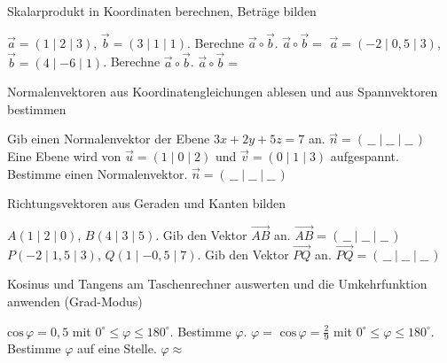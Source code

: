 \setcounter{aufgabe}{0}

\begin{aufgabe}{Skalarprodukt in Koordinaten berechnen, Beträge bilden}
\begin{teile}
\teil $\vec a = (1 \mid 2 \mid 3)$, $\vec b = (3 \mid 1 \mid 1)$. Berechne $\vec a \circ \vec b$. $\vec a \circ \vec b =$ \leerfeld
\teil $\vec a = (-2 \mid 0{,}5 \mid 3)$, $\vec b = (4 \mid -6 \mid 1)$. Berechne $\vec a \circ \vec b$. $\vec a \circ \vec b =$ \leerfeld
\end{teile}
\end{aufgabe}

\begin{aufgabe}{Normalenvektoren aus Koordinatengleichungen ablesen und aus Spannvektoren bestimmen}
\begin{teile}
\teil Gib einen Normalenvektor der Ebene $3x + 2y + 5z = 7$ an. $\vec n = (\,\_\_ \mid \_\_ \mid \_\_\,)$
\teil Eine Ebene wird von $\vec u = (1 \mid 0 \mid 2)$ und $\vec v = (0 \mid 1 \mid 3)$ aufgespannt. Bestimme einen Normalenvektor. $\vec n = (\,\_\_ \mid \_\_ \mid \_\_\,)$
\end{teile}
\end{aufgabe}

\begin{aufgabe}{Richtungsvektoren aus Geraden und Kanten bilden}
\begin{teile}
\teil $A(1 \mid 2 \mid 0)$, $B(4 \mid 3 \mid 5)$. Gib den Vektor $\overrightarrow{AB}$ an. $\overrightarrow{AB} = (\,\_\_ \mid \_\_ \mid \_\_\,)$
\teil $P(-2 \mid 1{,}5 \mid 3)$, $Q(1 \mid -0{,}5 \mid 7)$. Gib den Vektor $\overrightarrow{PQ}$ an. $\overrightarrow{PQ} = (\,\_\_ \mid \_\_ \mid \_\_\,)$
\end{teile}
\end{aufgabe}

\begin{aufgabe}{Kosinus und Tangens am Taschenrechner auswerten und die Umkehrfunktion anwenden (Grad-Modus)}
\begin{teile}
\teil $\mathrm{cos}\,\varphi = 0{,}5$ mit $0^\circ \le \varphi \le 180^\circ$. Bestimme $\varphi$. $\varphi =$ \leerfeld
\teil $\mathrm{cos}\,\varphi = \frac{2}{9}$ mit $0^\circ \le \varphi \le 180^\circ$. Bestimme $\varphi$ auf eine Stelle. $\varphi \approx$ \leerfeld
\end{teile}
\end{aufgabe}

